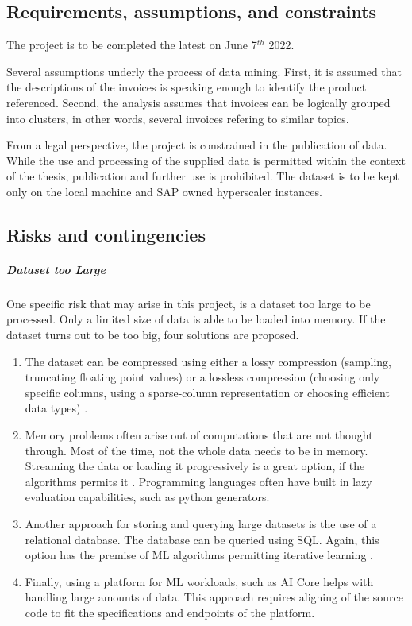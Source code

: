 \subsection{Requirements, assumptions, and constraints}
The project is to be completed the latest on June 7$^{th}$ 2022. 

Several assumptions underly the process of data mining. First, it is assumed that the descriptions of the invoices is speaking enough to identify the product referenced.
Second, the analysis assumes that invoices can be logically grouped into clusters, in other words, several invoices refering to similar topics.

From a legal perspective, the project is constrained in the publication of data. While the use and processing of the supplied data is permitted within the context of the thesis, publication and further use is prohibited. The dataset is to be kept only on the local machine and SAP owned hyperscaler instances.

\subsection{Risks and contingencies}
\subparagraph{Dataset too Large} One specific risk that may arise in this project, is a dataset too large to be processed. Only a limited size of data is able to be loaded into memory. If the dataset turns out to be too big, four solutions are proposed.

\begin{enumerate}
	\item The dataset can be compressed using either a lossy compression (sampling, truncating floating point values) or a lossless compression (choosing only specific columns, using a sparse-column representation or choosing efficient data types) \cite{largeDataSetMedium}.
	\item Memory problems often arise out of computations that are not thought through. Most of the time, not the whole data needs to be in memory. Streaming the data or loading it progressively is a great option, if the algorithms permits it \cite{largeDataSetBrownlee}. Programming languages often have built in lazy evaluation capabilities, such as python generators.
	\item Another approach for storing and querying large datasets is the use of a relational database. The database can be queried using \ac{SQL}. Again, this option has the premise of \ac{ML} algorithms permitting iterative learning \cite{largeDataSetBrownlee}. 
	\item Finally, using a platform for \ac{ML} workloads, such as AI Core helps with handling large amounts of data. This approach requires aligning of the source code to fit the specifications and endpoints of the platform.
\end{enumerate}

